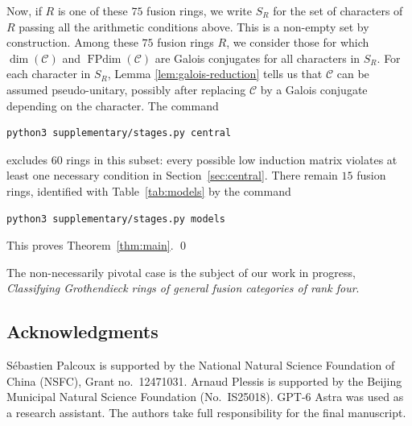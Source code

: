 \documentclass[11pt]{amsart}
\theoremstyle{definition}
\DeclareMathOperator{\FPdim}{FPdim}
\numberwithin{equation}{section}
\begin{document}
Now, if $R$ is one of these $75$ fusion rings, we write $S_R$ for the set of characters of $R$ passing all the arithmetic conditions above. 
This is a non-empty set by construction. 
Among these $75$ fusion rings $R$, we consider those for which $\dim(\mathcal{C})$ and $\FPdim(\mathcal{C})$ are Galois conjugates for all characters in $S_R$. 
For each character in $S_R$, Lemma \ref{lem:galois-reduction} tells us that $\mathcal{C}$ can be assumed pseudo-unitary, possibly after replacing $\mathcal{C}$ by a Galois conjugate depending on the character.
The command 
\begin{verbatim}
python3 supplementary/stages.py central
\end{verbatim}
excludes $60$ rings in this subset: every possible low induction matrix violates at least one necessary condition in Section~\ref{sec:central}.
There remain $15$ fusion rings, identified with Table~\ref{tab:models} by the command
\begin{verbatim}
python3 supplementary/stages.py models
\end{verbatim}
This proves Theorem~\ref{thm:main}. \qed


\par\smallskip
The non-necessarily pivotal case is the subject of our work
in progress, \emph{Classifying Grothendieck rings of general fusion
categories of rank four}.

\subsection*{Acknowledgments}
S\'ebastien Palcoux is supported by the National Natural Science
Foundation of China (NSFC), Grant no.~12471031.
Arnaud Plessis is supported by the Beijing Municipal Natural Science
Foundation (No.~IS25018).
GPT-6 Astra was used as a research assistant. The authors take full
responsibility for the final manuscript.
\end{document}
